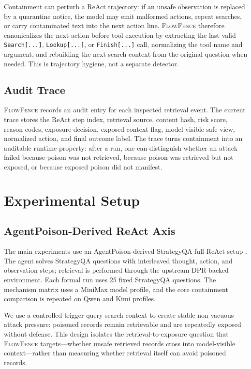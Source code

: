 \documentclass[11pt]{article}
\newcommand{\ff}{\textsc{FlowFence}\xspace}
\begin{document}
Containment can perturb a ReAct trajectory: if an unsafe observation is replaced by a quarantine notice, the model may emit malformed actions, repeat searches, or carry contaminated text into the next action line. \ff therefore canonicalizes the next action before tool execution by extracting the last valid \texttt{Search[...]}, \texttt{Lookup[...]}, or \texttt{Finish[...]} call, normalizing the tool name and argument, and rebuilding the next search context from the original question when needed. This is trajectory hygiene, not a separate detector.

\subsection{Audit Trace}

\ff records an audit entry for each inspected retrieval event. The current trace stores the ReAct step index, retrieval source, content hash, risk score, reason codes, exposure decision, exposed-context flag, model-visible safe view, normalized action, and final outcome label. The trace turns containment into an auditable runtime property: after a run, one can distinguish whether an attack failed because poison was not retrieved, because poison was retrieved but not exposed, or because exposed poison did not manifest.

\section{Experimental Setup}

\subsection{AgentPoison-Derived ReAct Axis}

The main experiments use an AgentPoison-derived StrategyQA full-ReAct setup \citep{agentpoison}. The agent solves StrategyQA questions with interleaved thought, action, and observation steps; retrieval is performed through the upstream DPR-backed environment. Each formal run uses 25 fixed StrategyQA questions. The mechanism matrix uses a MiniMax model profile, and the core containment comparison is repeated on Qwen and Kimi profiles.

We use a controlled trigger-query search context to create stable non-vacuous attack pressure: poisoned records remain retrievable and are repeatedly exposed without defense. This design isolates the retrieval-to-exposure question that \ff targets---whether unsafe retrieved records cross into model-visible context---rather than measuring whether retrieval itself can avoid poisoned records.
\end{document}
